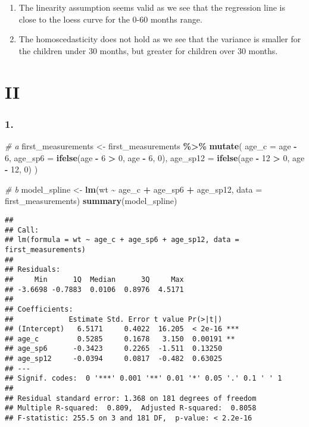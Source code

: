 \documentclass[
]{article}
\newenvironment{Shaded}{\begin{snugshade}}{\end{snugshade}}
\newcommand{\AttributeTok}[1]{\textcolor[rgb]{0.13,0.29,0.53}{#1}}
\newcommand{\CommentTok}[1]{\textcolor[rgb]{0.56,0.35,0.01}{\textit{#1}}}
\newcommand{\DecValTok}[1]{\textcolor[rgb]{0.00,0.00,0.81}{#1}}
\newcommand{\FunctionTok}[1]{\textcolor[rgb]{0.13,0.29,0.53}{\textbf{#1}}}
\newcommand{\NormalTok}[1]{#1}
\newcommand{\OtherTok}[1]{\textcolor[rgb]{0.56,0.35,0.01}{#1}}
\newcommand{\SpecialCharTok}[1]{\textcolor[rgb]{0.81,0.36,0.00}{\textbf{#1}}}
\begin{document}
\begin{enumerate}
\def\labelenumi{\alph{enumi}.}
\item
  The linearity assumption seems valid as we see that the regression
  line is close to the loess curve for the 0-60 months range.
\item
  The homoscedasticity does not hold as we see that the variance is
  smaller for the children under 30 months, but greater for children
  over 30 months.
\end{enumerate}

\section{II}\label{ii}

\subsubsection{1.}\label{section-3}

\begin{Shaded}
\begin{Highlighting}[]
\CommentTok{\# a}
\NormalTok{first\_measurements }\OtherTok{\textless{}{-}}\NormalTok{ first\_measurements }\SpecialCharTok{\%\textgreater{}\%}
  \FunctionTok{mutate}\NormalTok{(}
    \AttributeTok{age\_c =}\NormalTok{ age }\SpecialCharTok{{-}} \DecValTok{6}\NormalTok{,               }
    \AttributeTok{age\_sp6 =} \FunctionTok{ifelse}\NormalTok{(age }\SpecialCharTok{{-}} \DecValTok{6} \SpecialCharTok{\textgreater{}} \DecValTok{0}\NormalTok{, age }\SpecialCharTok{{-}} \DecValTok{6}\NormalTok{, }\DecValTok{0}\NormalTok{),    }
    \AttributeTok{age\_sp12 =} \FunctionTok{ifelse}\NormalTok{(age }\SpecialCharTok{{-}} \DecValTok{12} \SpecialCharTok{\textgreater{}} \DecValTok{0}\NormalTok{, age }\SpecialCharTok{{-}} \DecValTok{12}\NormalTok{, }\DecValTok{0}\NormalTok{)  }
\NormalTok{  )}

\CommentTok{\# b}
\NormalTok{model\_spline }\OtherTok{\textless{}{-}} \FunctionTok{lm}\NormalTok{(wt }\SpecialCharTok{\textasciitilde{}}\NormalTok{ age\_c }\SpecialCharTok{+}\NormalTok{ age\_sp6 }\SpecialCharTok{+}\NormalTok{ age\_sp12, }\AttributeTok{data =}\NormalTok{ first\_measurements)}
\FunctionTok{summary}\NormalTok{(model\_spline)}
\end{Highlighting}
\end{Shaded}

\begin{verbatim}
## 
## Call:
## lm(formula = wt ~ age_c + age_sp6 + age_sp12, data = first_measurements)
## 
## Residuals:
##     Min      1Q  Median      3Q     Max 
## -3.6698 -0.7883  0.0106  0.8976  4.5171 
## 
## Coefficients:
##             Estimate Std. Error t value Pr(>|t|)    
## (Intercept)   6.5171     0.4022  16.205  < 2e-16 ***
## age_c         0.5285     0.1678   3.150  0.00191 ** 
## age_sp6      -0.3423     0.2265  -1.511  0.13250    
## age_sp12     -0.0394     0.0817  -0.482  0.63025    
## ---
## Signif. codes:  0 '***' 0.001 '**' 0.01 '*' 0.05 '.' 0.1 ' ' 1
## 
## Residual standard error: 1.368 on 181 degrees of freedom
## Multiple R-squared:  0.809,  Adjusted R-squared:  0.8058 
## F-statistic: 255.5 on 3 and 181 DF,  p-value: < 2.2e-16
\end{verbatim}
\end{document}
